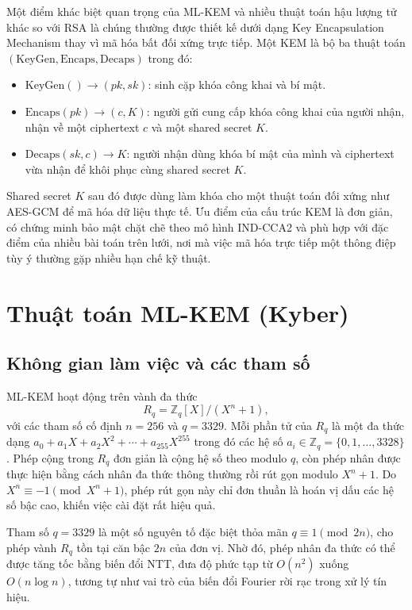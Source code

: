 Một điểm khác biệt quan trọng của ML-KEM và nhiều thuật toán hậu lượng tử khác so với RSA là chúng thường được thiết kế dưới dạng Key Encapsulation Mechanism thay vì mã hóa bất đối xứng trực tiếp. Một KEM là bộ ba thuật toán $(\text{KeyGen}, \text{Encaps}, \text{Decaps})$ trong đó:
\begin{itemize}
    \item $\text{KeyGen}() \to (pk, sk)$: sinh cặp khóa công khai và bí mật.
    \item $\text{Encaps}(pk) \to (c, K)$: người gửi cung cấp khóa công khai của người nhận, nhận về một ciphertext $c$ và một shared secret $K$.
    \item $\text{Decaps}(sk, c) \to K$: người nhận dùng khóa bí mật của mình và ciphertext vừa nhận để khôi phục cùng shared secret $K$.
\end{itemize}
Shared secret $K$ sau đó được dùng làm khóa cho một thuật toán đối xứng như AES-GCM để mã hóa dữ liệu thực tế. Ưu điểm của cấu trúc KEM là đơn giản, có chứng minh bảo mật chặt chẽ theo mô hình IND-CCA2 và phù hợp với đặc điểm của nhiều bài toán trên lưới, nơi mà việc mã hóa trực tiếp một thông điệp tùy ý thường gặp nhiều hạn chế kỹ thuật.

\section{Thuật toán ML-KEM (Kyber)}

\subsection{Không gian làm việc và các tham số}

ML-KEM hoạt động trên vành đa thức
\[
R_q = \mathbb{Z}_q[X] / (X^n + 1),
\]
với các tham số cố định $n = 256$ và $q = 3329$. Mỗi phần tử của $R_q$ là một đa thức dạng $a_0 + a_1 X + a_2 X^2 + \cdots + a_{255} X^{255}$ trong đó các hệ số $a_i \in \mathbb{Z}_q = \{0, 1, \ldots, 3328\}$. Phép cộng trong $R_q$ đơn giản là cộng hệ số theo modulo $q$, còn phép nhân được thực hiện bằng cách nhân đa thức thông thường rồi rút gọn modulo $X^n + 1$. Do $X^n \equiv -1 \pmod{X^n+1}$, phép rút gọn này chỉ đơn thuần là hoán vị dấu các hệ số bậc cao, khiến việc cài đặt rất hiệu quả.

Tham số $q = 3329$ là một số nguyên tố đặc biệt thỏa mãn $q \equiv 1 \pmod{2n}$, cho phép vành $R_q$ tồn tại căn bậc $2n$ của đơn vị. Nhờ đó, phép nhân đa thức có thể được tăng tốc bằng biến đổi NTT, đưa độ phức tạp từ $O(n^2)$ xuống $O(n \log n)$, tương tự như vai trò của biến đổi Fourier rời rạc trong xử lý tín hiệu.

